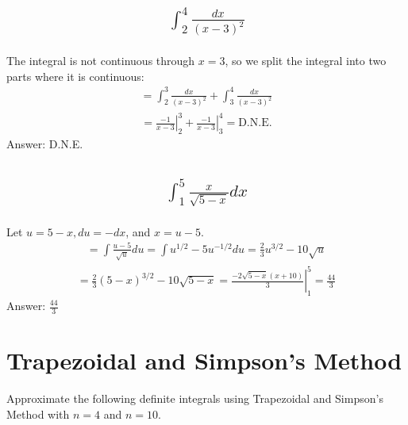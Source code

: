 \documentclass{article}
\begin{document}
\subsection{
	\begin{align*}
		\int_2^4{\frac{dx}{(x-3)^2}}
	\end{align*}
}
The integral is not continuous through $x = 3$, so we split the integral into two parts where it is continuous:
\begin{align*}
	= \int_2^3{\frac{dx}{(x-3)^2}} + \int_3^4{\frac{dx}{(x-3)^2}}
\end{align*}
\begin{align*}
	\left. = \frac{-1}{x - 3} \right|_2^3 + \left. \frac{-1}{x - 3} \right|_3^4 = \text{D.N.E.}
\end{align*}
Answer: D.N.E.

\subsection{
	\begin{align*}
		\int_1^5{\frac{x}{\sqrt{5 - x}} dx}
	\end{align*}
}
Let $u = 5 - x, du = -dx$, and $x = u - 5$. 
\begin{align*}
	= \int{\frac{u - 5}{\sqrt{u}}du} = \int{u^{1/2} - 5u^{-1/2}du} = \frac{2}{3}u^{3/2} - 10\sqrt{u}
\end{align*}
\begin{align*}
	= \frac{2}{3}(5 - x)^{3/2} - 10 \sqrt{5 - x}= \left. \frac{-2\sqrt{5 - x}(x + 10)}{3} \right|_1^5 = \frac{44}{3}
\end{align*}
Answer: $\frac{44}{3}$

\section{Trapezoidal and Simpson's Method}
Approximate the following definite integrals using Trapezoidal and Simpson’s Method with $n = 4$ and $n = 10$.
\end{document}

